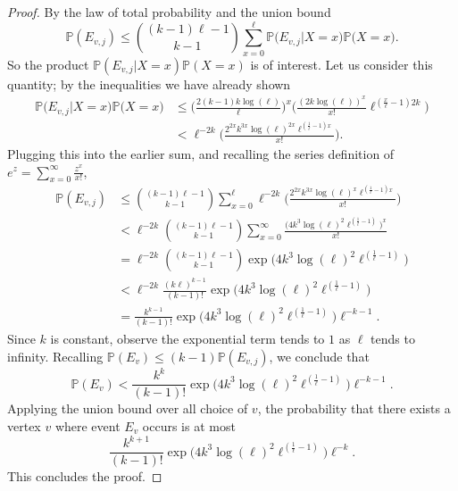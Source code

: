 \documentclass[10pt,a4paper]{amsart}
\begin{document}
\begin{proof}
    By the law of total probability and the union bound 
    \[
     \mathbb{P}( E_{v,j}) \leq \binom{(k-1)\ell-1}{k-1} \sum_{x=0}^\ell \mathbb{P}\Big( E_{v,j} | X = x\Big)\mathbb{P}\Big(X = x\Big).
    \]
    So the product $\mathbb{P}( E_{v,j} | X = x)\mathbb{P}(X = x)$ is of interest.
    Let us consider this quantity; by the inequalities we have already shown
    \begin{align*}
        \mathbb{P}\Big( E_{v,j} | X = x\Big)\mathbb{P}\Big(X = x\Big) & \leq \Bigg(\frac{2(k-1)k\log(\ell)}{\ell} \Bigg)^x \Bigg(\frac{(2k\log(\ell))^x}{x!}\ell^{(\frac{x}{\ell}-1)2k} \Bigg) \\
        & < \ell^{-2k}\Bigg(\frac{2^{2x} k^{3x} \log(\ell)^{2x} \ell^{(\frac{1}{\ell}-1)x}}{x!} \Bigg).
    \end{align*}
    Plugging this into the earlier sum, and recalling the series definition of $e^z = \sum_{x=0}^\infty \frac{z^x}{x!}$,
    \begin{align*}
        \mathbb{P}( E_{v,j}) & \leq \binom{(k-1)\ell-1}{k-1} \sum_{x=0}^\ell \ell^{-2k}\Bigg(\frac{2^{2x} k^{3x} \log(\ell)^x \ell^{(\frac{1}{\ell}-1)x}}{x!} \Bigg) \\
        & < \ell^{-2k} \binom{(k-1)\ell-1}{k-1}  \sum_{x=0}^\infty \frac{\Big(4 k^{3} \log(\ell)^2 \ell^{(\frac{1}{\ell}-1)}\Big)^x}{x!} \\
        & = \ell^{-2k} \binom{(k-1)\ell-1}{k-1} \exp\Big(4 k^{3} \log(\ell)^2 \ell^{(\frac{1}{\ell}-1)}\Big) \\
        & < \ell^{-2k} \frac{(k\ell)^{k-1}}{(k-1)!} \exp\Big(4 k^{3} \log(\ell)^2 \ell^{(\frac{1}{\ell}-1)}\Big) \\
        & = \frac{k^{k-1}}{(k-1)!}\exp\Big(4 k^{3} \log(\ell)^2 \ell^{(\frac{1}{\ell}-1)}\Big)\ell^{-k-1}.
    \end{align*}
    Since $k$ is constant,
    observe the exponential term tends to $1$ as $\ell$ tends to infinity.
    Recalling $\mathbb{P}(E_v) \leq (k-1)\mathbb{P}(E_{v,j})$,
    we conclude that 
    \[
    \mathbb{P}(E_v) < \frac{k^{k}}{(k-1)!}\exp\Big(4 k^{3} \log(\ell)^2 \ell^{(\frac{1}{\ell}-1)}\Big)\ell^{-k-1}.
    \]
    Applying the union bound over all choice of $v$,
    the probability that there exists a vertex $v$ where event $E_v$ occurs is at most 
    \[
    \frac{k^{k+1}}{(k-1)!}\exp\Big(4 k^{3} \log(\ell)^2 \ell^{(\frac{1}{\ell}-1)}\Big)\ell^{-k}.
    \]
    This concludes the proof.
\end{proof}
\end{document}
